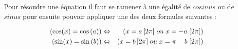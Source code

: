 Pour résoudre une équation il faut se ramener à une égalité de $cosinus$ ou de $sinus$ pour ensuite pouvoir appliquer une des deux formules suivantes :

\begin{eqnarray}
(\cos(x) = \cos\left(a\right)) & \Leftrightarrow & (x = a \,[2\pi]  \; ou \; x = -a \; [2\pi]) \\
(\sin(x) = \sin\left(b\right)) & \Leftrightarrow & (x = b \, [2\pi] \; ou \; x = \pi - b \; [2\pi])
\end{eqnarray}
